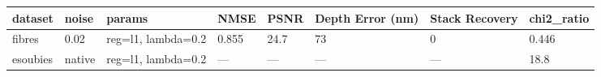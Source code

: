 \begin{center}\begin{minipage}{\linewidth}\centering
{}
\begin{adjustbox}{max width=\linewidth}
\begin{tabular}{llllllll}
\toprule
dataset & noise & params & NMSE & PSNR & Depth Error (nm) & Stack Recovery & chi2\_ratio \\
\midrule
fibres & 0.02 & reg=l1, lambda=0.2 & 0.855 & 24.7 & 73 & 0 & 0.446 \\
esoubies & native & reg=l1, lambda=0.2 & — & — & — & — & 18.8 \\
\bottomrule
\end{tabular}\end{adjustbox}\end{minipage}\end{center}
